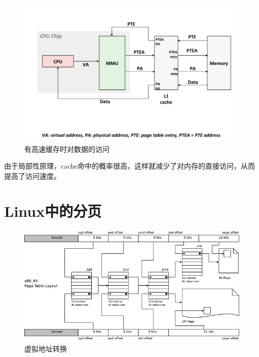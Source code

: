 \begin{figure}[!htbp]
\begin{center}
\includegraphics[width=1\textwidth]{highvava.png}
\caption{有高速缓存时对数据的访问}
\end{center}
\end{figure}

由于局部性原理，cache命中的概率很高，这样就减少了对内存的直接访问，从而提高了访问速度。



\section{Linux中的分页}

\paragraph{}

\begin{figure}[!htbp]
\begin{center}
\includegraphics[width=1\textwidth]{va-to-pa.png}
\caption{虚拟地址转换\cite{linuxmm}}
\end{center}
\end{figure}


